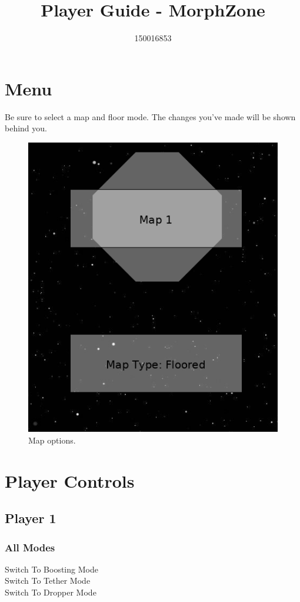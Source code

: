 \documentclass[10pt,a4paper]{article}
\author{150016853}
\title{Player Guide - MorphZone}
\begin{document}
\section{Menu}

Be sure to select a map and floor mode. The changes you've made will be shown behind you.

\begin{figure}[!h]
\centering
  \includegraphics[scale=0.5]{menu_options.png}
  \caption{Map options.}
  \label{fig:boat1}
\end{figure}

\section{Player Controls}

\subsection{Player 1}

\subsubsection*{All Modes}

 \makebox[0.5cm]{-} Switch To Boosting Mode
\\ \makebox[0.5cm]{-} Switch To Tether Mode
\\ \makebox[0.5cm]{-} Switch To Dropper Mode
\end{document}

